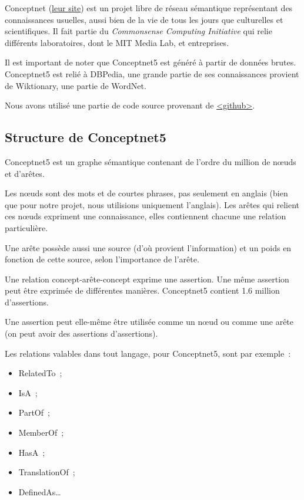 \documentclass[a4paper, 12pt]{article}
\newcommand{\ang}[1]{\textit{#1}}%
\begin{document}
Conceptnet (\href{http://conceptnet5.media.mit.edu/}{leur site}) est un projet libre de réseau sémantique représentant des connaissances usuelles, aussi bien de la vie de tous les jours que culturelles et scientifiques. Il fait partie du \ang{Commonsense Computing Initiative} qui relie différents laboratoires, dont le MIT Media Lab, et entreprises.

Il est important de noter que Conceptnet5 est généré à partir de données brutes. Conceptnet5 est relié à DBPedia, une grande partie de ses connaissances provient de Wiktionary, une partie de WordNet.

Nous avons utilisé une partie de code source provenant de \href{https://github.com/commonsense/conceptnet5}{<github>}.


\subsection{Structure de Conceptnet5}

Conceptnet5 est un graphe sémantique contenant de l'ordre du million de nœuds et d'ar\^etes.

Les n\oe{}uds sont des mots et de courtes phrases, pas seulement en anglais (bien que pour notre projet, nous utilisions uniquement l'anglais). Les arêtes qui relient ces n\oe{}uds expriment une connaissance, elles contiennent chacune une relation particulière.

Une arête possède aussi une source (d'où provient l'information) et un poids en fonction de cette source, selon l'importance de l'arête.

Une relation concept-arête-concept exprime une assertion. Une même assertion peut être exprimée de différentes manières. Conceptnet5 contient 1.6 million d'assertions.

Une assertion peut elle-même être utilisée comme un n\oe{}ud ou comme une arête (on peut avoir des assertions d'assertions).

Les relations valables dans tout langage, pour Conceptnet5, sont par exemple~:
\begin{itemize}
 \item RelatedTo~;
 \item IsA~;
 \item PartOf~;
 \item MemberOf~;
 \item HasA~;
 \item TranslationOf~;
 \item DefinedAs\ldots{}
\end{itemize}
\end{document}
